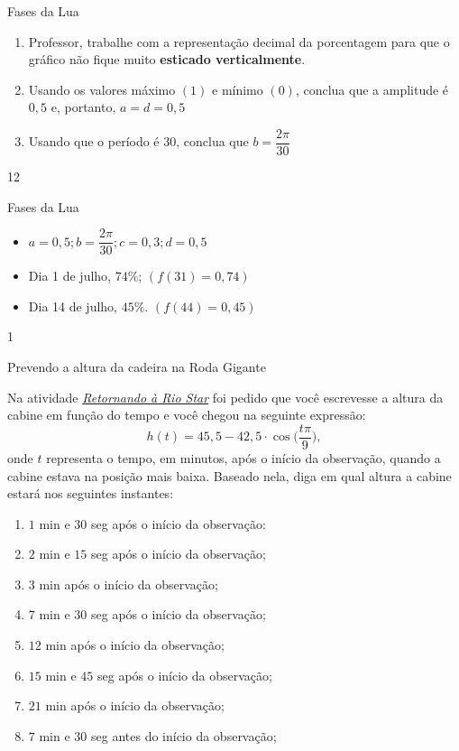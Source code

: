 \begin{sugestions}{Fases da Lua}
{
\begin{enumerate}
\item Professor, trabalhe com a representação decimal da
porcentagem para que o gráfico não fique muito \textbf{esticado
verticalmente}.
\item Usando os valores máximo $(1)$ e mínimo $(0)$, conclua que a
amplitude é $0{,}5$ e, portanto, $a=d=0{,}5$
\item Usando que o período é $30$, conclua que $b=\dfrac{2\pi}{30}$
\end{enumerate}
}{1}{2}
\end{sugestions}
\begin{answer}{Fases da Lua}
{
\begin{itemize}
\item $a=0{,}5; b=\dfrac{2\pi}{30};c=0{,}3; d=0{,}5$
\item Dia 1 de julho, $74\%$; $(f(31)=0{,}74)$
\item Dia 14 de julho, $45\%$. $(f(44)=0{,}45)$
\end{itemize}
}{1}
\end{answer}

\begin{task}{Prevendo a altura da cadeira na Roda Gigante}

Na atividade \hyperref[trig-ativ15]{\textit{Retornando à Rio Star}} foi pedido que você escrevesse a altura da cabine em função do tempo e você chegou na seguinte expressão:
\begin{equation*}
h(t)=45{,}5-42{,}5\cdot\cos\bigg(\frac{t\pi}{9}\bigg),
\end{equation*}
onde $t$ representa o tempo, em minutos, após o início da observação, quando a cabine estava na posição mais baixa. Baseado nela, diga em qual altura a cabine estará nos seguintes instantes:

\begin{enumerate}
\item $1$ min e $30$ seg após o início da observação:
\item $2$ min e $15$ seg após o início da observação;
\item $3$ min após o início da observação;
\item $7$ min e $30$ seg após o início da observação;
\item $12$ min após o início da observação;
\item $15$ min e $45$ seg após o início da observação;
\item $21$ min após o início da observação;
\item $7$ min e $30$ seg antes do início da observação;
\end{enumerate}
\end{task}

